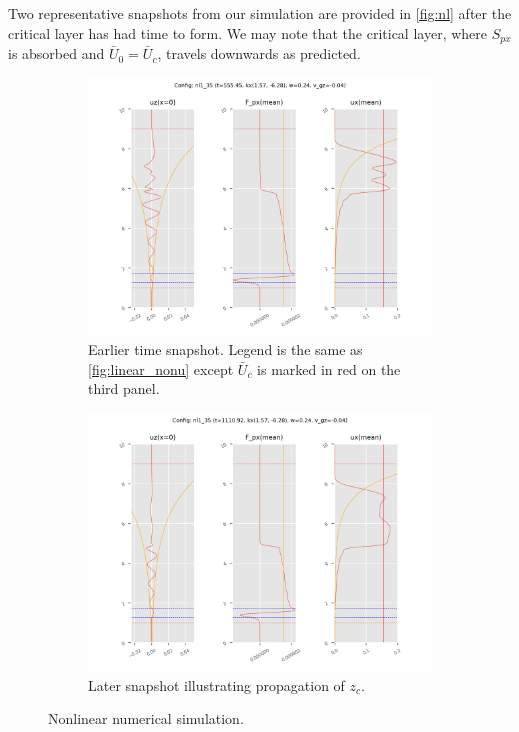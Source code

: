 \documentclass[twocolumn,
        nofootinbib, %
        usenames, %
        aps,
        prd,
        dvipsnames %
    ]{revtex4-1}%
\begin{document}
Two representative snapshots from our simulation are provided in
\autoref{fig:nl} after the critical layer has had time to form. We may note that
the critical layer, where $S_{px}$ is absorbed and $\bar{U}_0 = \bar{U}_c$,
travels downwards as predicted.
\begin{figure}[t]
    \centering
    \begin{subfigure}{0.5\textwidth}
        \centering
        \includegraphics[width=\textwidth]{plots/nl35_1.png}
        \caption{Earlier time snapshot. Legend is the same as
        \autoref{fig:linear_nonu} except $\bar{U}_c$ is marked in red on the
        third panel.}
    \end{subfigure}

    \begin{subfigure}{0.5\textwidth}
        \centering
        \includegraphics[width=\textwidth]{plots/nl35_2.png}
        \caption{Later snapshot illustrating propagation of $z_c$.}
    \end{subfigure}
    \caption{Nonlinear numerical simulation.}\label{fig:nl}
\end{figure}
\end{document}
